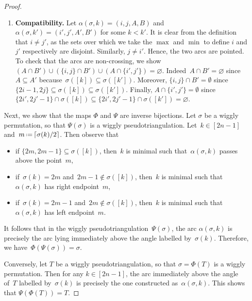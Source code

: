 \documentclass{amsart}
\theoremstyle{definition}
\newcommand{\eqdef}{\mbox{\,\raisebox{0.2ex}{\scriptsize\ensuremath{\mathrm:}}\ensuremath{=}\,}} %
\begin{document}
\begin{proof}
\begin{enumerate}
\item \textbf{Compatibility.}
Let $\alpha(\sigma, k) = (i,j,A,B)$ and $\alpha(\sigma, k') = (i',j',A',B')$ for some \(k < k'\).
It is clear from the definition that \(i \neq j'\), as the sets over which we take the $\max$ and $\min$ to define \(i\) and \(j'\) respectively are disjoint.
Similarly, \(j \neq i'\).
Hence, the two arcs are pointed.
To check that the arcs are non-crossing, we show $(A \cap B') \cup (\{i,j\} \cap B') \cup (A \cap \{i',j'\}) = \varnothing$.
Indeed~$A \cap B' = \varnothing$ since~$A \subseteq A'$ because~$\sigma([k]) \subseteq \sigma([k'])$.
Moreover, \(\{i,j\} \cap B' = \emptyset\) since~\(\{2i - 1, 2j\} \subseteq \sigma([k]) \subseteq \sigma([k'])\).
Finally, \(A \cap \{i',j'\} = \emptyset\) since~\(\{2i', 2j'-1\} \cap \sigma([k]) \subseteq \{2i', 2j'-1\} \cap \sigma([k']) = \varnothing\).
\end{enumerate}

Next, we show that the maps \(\Phi\) and \(\Psi\) are inverse bijections.
Let \(\sigma\) be a wiggly permutation, so that \(\Psi(\sigma)\) is a wiggly pseudotriangulation.
Let~$k \in [2n-1]$ and~$m \eqdef \lceil \sigma(k)/2 \rceil$.
Then observe that
\begin{itemize}
\item if $\{2m, 2m-1\} \subseteq \sigma([k])$, then~$k$ is minimal such that~$\alpha(\sigma,k)$ passes above the point~$m$,
\item if~$\sigma(k) = 2m$ and~$2m-1 \notin \sigma([k])$, then~$k$ is minimal such that~$\alpha(\sigma,k)$ has right endpoint~$m$,
\item if~$\sigma(k) = 2m-1$ and~$2m \notin \sigma([k])$, then~$k$ is minimal such that~$\alpha(\sigma,k)$ has left endpoint~$m$.
\end{itemize}
It follows that in the wiggly pseudotriangulation~\(\Psi(\sigma)\), the arc \(\alpha(\sigma, k)\) is precisely the arc lying immediately above the angle labelled by~\(\sigma(k)\).
Therefore, we have~\(\Phi(\Psi(\sigma)) = \sigma\).

Conversely, let \(T\) be a wiggly pseudotriangulation, so that \(\sigma = \Phi(T)\) is a wiggly permutation.
Then for any \(k \in [2n-1]\), the arc immediately above the angle of~$T$ labelled by~$\sigma(k)$ is precisely the one constructed as~\(\alpha(\sigma, k)\).
This shows that \(\Psi(\Phi(T)) = T\).


\end{proof}
\end{document}
